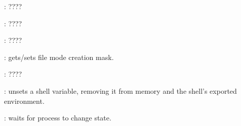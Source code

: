 \begin{compactenum}
\item [\symbolbash] : \dotfill ????

\item [\symbolbash] : \dotfill ????

\item [\symbolbash] : \dotfill ????

\item [\symbolbash] : gets/sets file mode creation mask.

\item [\symbolbash] : \dotfill ????

\item [\symbolbash] : unsets a shell variable, removing it from memory and the shell's exported environment.

\item [\symbolbash] : waits for process to change state.
\end{compactenum}


